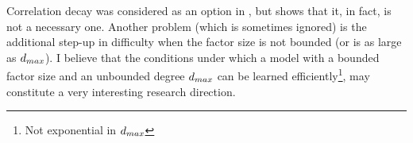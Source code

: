 Correlation decay was considered as an option in \cite{montanari2009graphical}, but \cite{bresler2014structure} shows that it, in fact, is not a necessary one. 
Another problem (which is sometimes ignored) is the additional step-up in difficulty when the factor size is not bounded (or is as large as $d_{max}$). 
I believe that the conditions under which a model with a bounded factor size and an unbounded degree $d_{max}$ can be learned efficiently\footnote{Not exponential in $d_{max}$}, may constitute a very interesting research direction.
